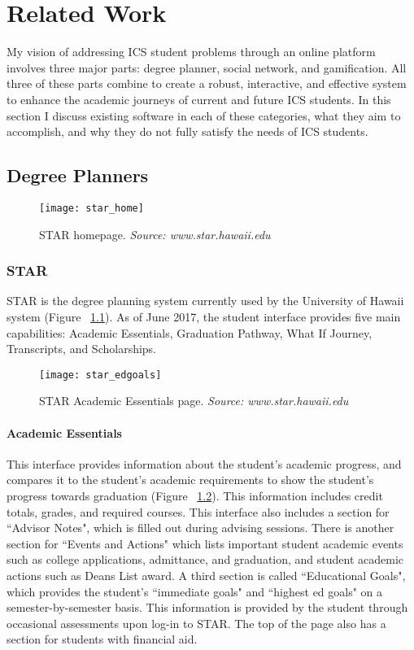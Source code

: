 \chapter{Related Work}
\label{related-work}

My vision of addressing ICS student problems through an online platform involves three major parts: degree planner, social network, and gamification. All three of these parts combine to create a robust, interactive, and effective system to enhance the academic journeys of current and future ICS students. In this section I discuss existing software in each of these categories, what they aim to accomplish, and why they do not fully satisfy the needs of ICS students.

\section{Degree Planners}
\begin{figure}[h]
\centering
\texttt{[image: star\_home]}
\caption{STAR homepage. \textit{Source: www.star.hawaii.edu}}
\label{star-home}
\end{figure}
\subsection{STAR}

STAR is the degree planning system currently used by the University of Hawaii system \cite{STAR} (Figure ~\ref{star-home}). As of June 2017, the student interface provides five main capabilities: Academic Essentials, Graduation Pathway, What If Journey, Transcripts, and Scholarships. 

\begin{figure}[h]
\centering
\texttt{[image: star\_edgoals]}
\caption{STAR Academic Essentials page. \textit{Source: www.star.hawaii.edu}}
\label{star-edgoals}
\end{figure}
\subsubsection{Academic Essentials}

This interface provides information about the student's academic progress, and compares it to the student's academic requirements to show the student's progress towards graduation (Figure ~\ref{star-edgoals}). This information includes credit totals, grades, and required courses. This interface also includes a section for ``Advisor Notes", which is filled out during advising sessions. There is another section for ``Events and Actions" which lists important student academic events such as college applications, admittance, and graduation, and student academic actions such as Deans List award. A third section is called ``Educational Goals", which provides the student's ``immediate goals" and ``highest ed goals" on a semester-by-semester basis. This information is provided by the student through occasional assessments upon log-in to STAR. The top of the page also has a section for students with financial aid.

